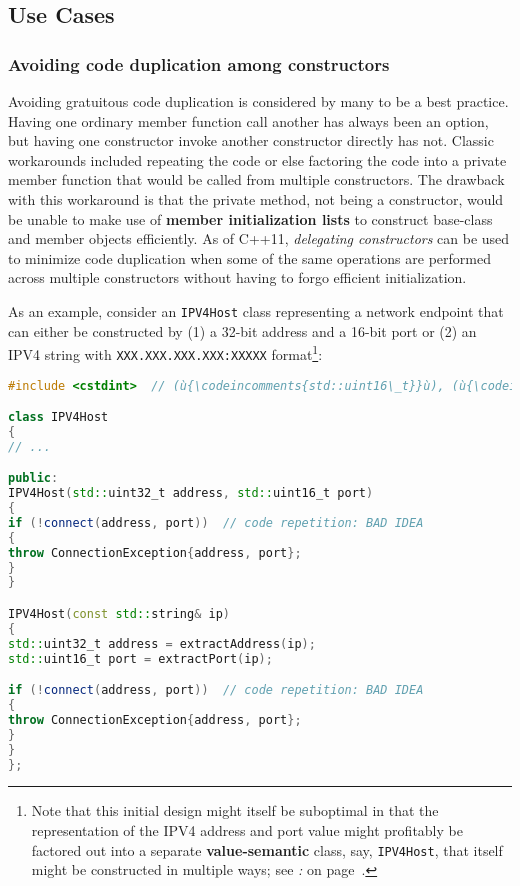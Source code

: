 \subsection[Use Cases]{Use Cases}\label{ctordelegating-use-cases}

\subsubsection[Avoiding code duplication among constructors]{Avoiding code duplication among constructors}\label{avoiding-code-duplication-among-constructors}

Avoiding gratuitous code duplication is considered by many to be a best
practice. Having one ordinary member function call another has always
been an option, but having one constructor invoke another constructor
directly has not. Classic workarounds included repeating the code or
else factoring the code into a private member function that would be
called from multiple constructors. The drawback with this workaround is
that the private method, not being a constructor, would be unable to
make use of \textbf{member initialization lists} to construct base-class
and member objects efficiently. As of C++11, \emph{delegating
constructors} can be used to minimize code duplication when some of
the same operations are performed across multiple constructors without
having to forgo efficient initialization.

As an example, consider an \texttt{IPV4Host} class representing a
network endpoint that can either be constructed by (1) a 32-bit address
and a 16-bit port or (2) an IPV4 string with
\texttt{XXX.XXX.XXX.XXX:XXXXX} format{\cprotect\footnote{Note that
this initial design might itself be suboptimal in that the
representation of the IPV4 address and port value might profitably be
factored out into a separate \textbf{value-semantic} class, say,
\texttt{IPV4Host}, that itself might be constructed in multiple ways;
see {\it{}:} {\it{}} on page~\pageref{suboptimal-factoring}.}}:

\begin{lstlisting}[language=C++]
#include <cstdint>  // (ù{\codeincomments{std::uint16\_t}}ù), (ù{\codeincomments{std::uint32\_t}}ù)

class IPV4Host
{
// ...

public:
IPV4Host(std::uint32_t address, std::uint16_t port)
{
if (!connect(address, port))  // code repetition: BAD IDEA
{
throw ConnectionException{address, port};
}
}

IPV4Host(const std::string& ip)
{
std::uint32_t address = extractAddress(ip);
std::uint16_t port = extractPort(ip);

if (!connect(address, port))  // code repetition: BAD IDEA
{
throw ConnectionException{address, port};
}
}
};
\end{lstlisting}

